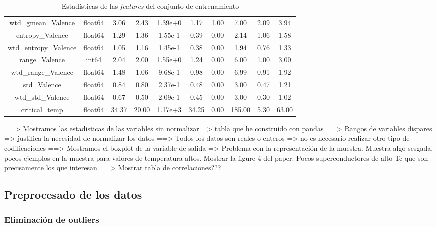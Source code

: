\documentclass[11pt]{article}
\begin{document}
\begin{table}
{\begin{tabular}{|c|c|c|c|c|c|c|c|c|c|}
wtd\_gmean\_Valence                & float64&     3.06&     2.43&  1.39e+0&     1.17&    1.00&      7.00&     2.09&     3.94 \\
entropy\_Valence                  & float64&     1.29&     1.36&  1.55e-1&     0.39&    0.00&      2.14&     1.06&     1.58 \\
wtd\_entropy\_Valence              & float64&     1.05&     1.16&  1.45e-1&     0.38&    0.00&      1.94&     0.76&     1.33 \\
range\_Valence                    &   int64&     2.04&     2.00&  1.55e+0&     1.24&    0.00&      6.00&     1.00&     3.00 \\
wtd\_range\_Valence                & float64&     1.48&     1.06&  9.68e-1&     0.98&    0.00&      6.99&     0.91&     1.92 \\
std\_Valence                      & float64&     0.84&     0.80&  2.37e-1&     0.48&    0.00&      3.00&     0.47&     1.21 \\
wtd\_std\_Valence                  & float64&     0.67&     0.50&  2.09e-1&     0.45&    0.00&      3.00&     0.30&     1.02 \\
critical\_temp                    & float64&    34.37&    20.00&  1.17e+3&    34.25&    0.00&    185.00&     5.30&    63.00 \\
    \hline
    \end{tabular}
    }
    \caption{Estadísticas de las \emph{features} del conjunto de entrenamiento}
    \label{Tabla con los estadísticos de las features 2}
\end{table}

==> Mostramos las estadisticas de las variables sin normalizar => tabla que he construido con pandas
==> Rangos de variables dispares => justifica la necesidad de normalizar los datos
==> Todos los datos son reales o enteros => no es necesario realizar otro tipo de codificaciones
==> Mostramos el boxplot de la variable de salida => Problema con la representación de la muestra. Muestra algo sesgada, pocos ejemplos en la muestra para valores de temperatura altos. Mostrar la figure 4 del paper. Pocos superconductores de alto Tc que son precisamente los que interesan
==> Mostrar tabla de correlaciones???

\subsection{Preprocesado de los datos}

\subsubsection{Eliminación de outliers}
\end{document}
